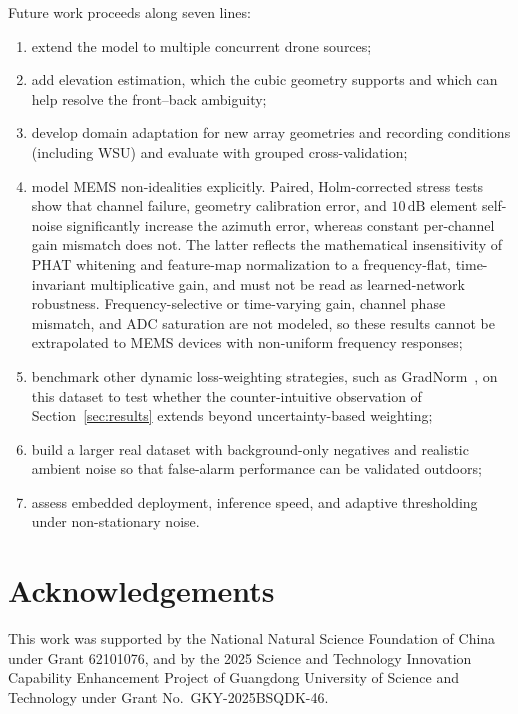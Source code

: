 \documentclass[5p,twocolumn]{elsarticle}
\begin{document}
Future work proceeds along seven lines:
\begin{enumerate}
    \item extend the model to multiple concurrent drone sources;
    \item add elevation estimation, which the cubic geometry supports and which can help resolve the front--back ambiguity;
    \item develop domain adaptation for new array geometries and recording conditions (including WSU) and evaluate with grouped cross-validation;
    \item model MEMS non-idealities explicitly. Paired, Holm-corrected stress tests show that channel failure, geometry calibration error, and $10\,\mathrm{dB}$ element self-noise significantly increase the azimuth error, whereas constant per-channel gain mismatch does not. The latter reflects the mathematical insensitivity of PHAT whitening and feature-map normalization to a frequency-flat, time-invariant multiplicative gain, and must not be read as learned-network robustness. Frequency-selective or time-varying gain, channel phase mismatch, and ADC saturation are not modeled, so these results cannot be extrapolated to MEMS devices with non-uniform frequency responses;
    \item benchmark other dynamic loss-weighting strategies, such as GradNorm~\cite{chen2018gradnorm}, on this dataset to test whether the counter-intuitive observation of Section~\ref{sec:results} extends beyond uncertainty-based weighting;
    \item build a larger real dataset with background-only negatives and realistic ambient noise so that false-alarm performance can be validated outdoors;
    \item assess embedded deployment, inference speed, and adaptive thresholding under non-stationary noise.
\end{enumerate}

\section*{Acknowledgements}
This work was supported by the National Natural Science Foundation of China under Grant 62101076, and by the 2025 Science and Technology Innovation Capability Enhancement Project of Guangdong University of Science and Technology under Grant No.~GKY-2025BSQDK-46.



\end{document}
